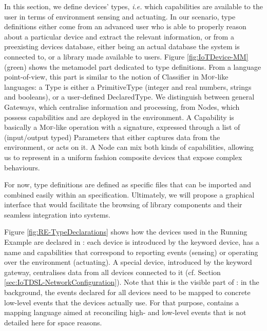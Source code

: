In this section, we define \IOT devices' types, \textit{i.e.} which capabilities are available to the user in terms of environment sensing and actuating. In our scenario, type definitions either come from an advanced user who is able to properly reason about a particular device and extract the relevant information, or from a preexisting devices database, either being an actual database the system is connected to, or a library made available to users. Figure \ref{fig:IoTDevice-MM} (green) shows the metamodel part dedicated to type definitions. From a language point-of-view, this part is similar to the notion of \textsf{Classifier} in \textsc{Mof}-like languages: a \textsf{Type} is either a \textsf{PrimitiveType} (integer and real numbers, strings and booleans), or a user-defined \textsf{DeclaredType}. We distinguish between general \textsf{Gateway}s, which centralise information and processing, from \textsf{Node}s, which possess capabilities and are deployed in the environment. A \textsf{Capability} is basically a \textsc{Mof}-like operation with a signature, expressed through a list of (input/output typed) \textsf{Parameter}s that either captures data from the environment, or acts on it. A \textsf{Node} can mix both kinds of capabilities, allowing us to represent in a uniform fashion composite devices that expose complex behaviours.
	
For now, type definitions are defined as specific files that can be imported and combined easily within an \IOT specification. Ultimately, we will propose a graphical interface that would facilitate the browsing of library components and their seamless integration into \IOT systems.

Figure \ref{fig:RE-TypeDeclarations} shows how the devices used in the Running Example are declared in \IOTDSL: each device is introduced by the keyword \textsf{device}, has a name and capabilities that correspond to reporting events (\textsf{sensing}) or operating over the environment (\textsf{actuating}). A special device, introduced by the keyword \textsf{gateway}, centralises data from all devices connected to it (cf. Section \ref{sec:IoTDSL-NetworkConfiguration}). Note that this is the visible part of \IOTDSL: in the background, the events declared for all devices need to be mapped to concrete low-level events that the devices actually use. For that purpose, \IOTDSL contains a mapping language aimed at reconciling high- and low-level events that is not detailed here for space reasons.

